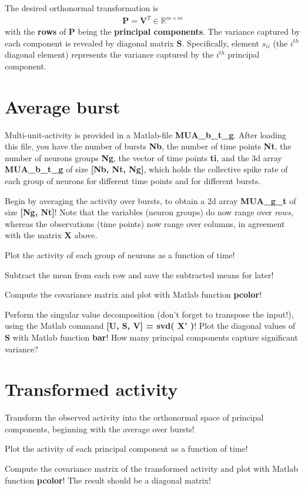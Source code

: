 \documentclass[a4paper,12pt]{article}
\newcommand{\ba}{\begin{eqnarray*}}
\newcommand{\ea}{\end{eqnarray*}}
\newcommand{\bs}[1]{\boldsymbol #1 }
\begin{document}
The desired orthonormal transformation is
\ba
\bs P = \bs V^T  \in \mathbb{R}^{m \times m}
\ea 
with the {\bf rows} of $\bs P$ being the {\bf principal components}.  The variance captured by each component is revealed by diagonal matrix $\bs S$.  Specifically, element $s_{ii}$ (the $i^{th}$ diagonal element) represents the variance captured by the $i^{th}$ principal component.

\section{Average burst}

Multi-unit-activity is provided in a Matlab-file {\bf MUA\_b\_t\_g}.  After loading this file, you have the number of bursts {\bf Nb}, the number of time points {\bf Nt}, the number of neurons groups {\bf Ng}, the vector of time points {\bf ti}, and the 3d array {\bf MUA\_b\_t\_g} of size {\bf [Nb, Nt, Ng]}, which holds the collective spike rate of each group of neurons for different time points and for different bursts.

Begin by averaging the activity over bursts, to obtain a 2d array {\bf MUA\_g\_t} of size {\bf [Ng, Nt]}!  Note that the variables (neuron groups) do now range over {\it rows}, whereas the observations (time points) now range over columns, in agreement with the matrix $\bs X$ above.

Plot the activity of each group of neurons as a function of time!

Subtract the mean from each row and save the subtracted means for later!

Compute the covariance matrix and plot with Matlab function {\bf pcolor}!

Perform the singular value decomposition (don't forget to transpose the input!), using the Matlab command {\bf [U, S, V] = svd( X' )}!  Plot the diagonal values of {\bf S} with Matlab function {\bf bar}!   How many principal components capture significant variance?

\section{Transformed activity}

Transform the observed activity into the orthonormal space of principal components, beginning with the average over bursts!

Plot the activity of each principal component as a function of time!

Compute the covariance matrix of the transformed activity and plot with Matlab function {\bf pcolor}!  The result should be a diagonal matrix!
\end{document}
